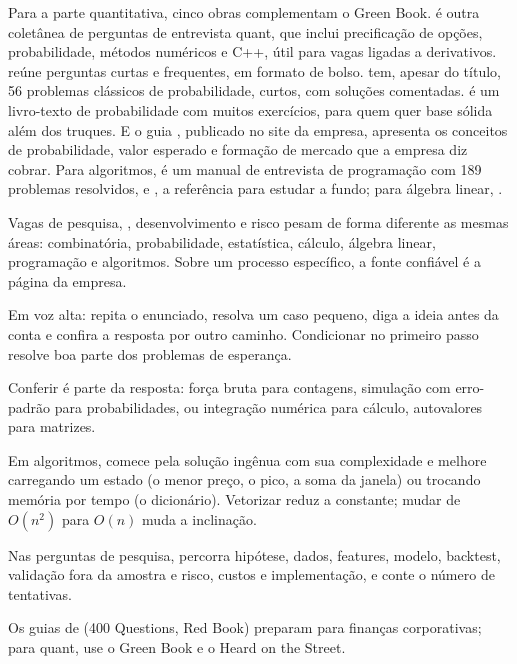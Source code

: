 Para a parte quantitativa, cinco obras complementam o Green Book. \citet{joshi2013} é outra coletânea de perguntas de entrevista quant, que inclui precificação de opções, probabilidade, métodos numéricos e C++, útil para vagas ligadas a derivativos. \citet{stefanica2019} reúne perguntas curtas e frequentes, em formato de bolso. \citet{mosteller1987} tem, apesar do título, 56 problemas clássicos de probabilidade, curtos, com soluções comentadas. \citet{blitzstein2019} é um livro-texto de probabilidade com muitos exercícios, para quem quer base sólida além dos truques. E o guia \citet{janestreetpm}, publicado no site da empresa, apresenta os conceitos de probabilidade, valor esperado e formação de mercado que a empresa diz cobrar. Para algoritmos, \citet{mcdowell2015} é um manual de entrevista de programação com 189 problemas resolvidos, e \citet{cormen2022}, a referência para estudar a fundo; para álgebra linear, \citet{strang2023}.

\begin{resumo}
  \item Vagas de pesquisa, , desenvolvimento e risco pesam de forma diferente as mesmas áreas: combinatória, probabilidade, estatística, cálculo, álgebra linear, programação e algoritmos. Sobre um processo específico, a fonte confiável é a página da empresa.
  \item Em voz alta: repita o enunciado, resolva um caso pequeno, diga a ideia antes da conta e confira a resposta por outro caminho. Condicionar no primeiro passo resolve boa parte dos problemas de esperança.
  \item Conferir é parte da resposta: força bruta para contagens, simulação com erro-padrão para probabilidades,  ou integração numérica para cálculo, autovalores para matrizes.
  \item Em algoritmos, comece pela solução ingênua com sua complexidade e melhore carregando um estado (o menor preço, o pico, a soma da janela) ou trocando memória por tempo (o dicionário). Vetorizar reduz a constante; mudar de $O(n^2)$ para $O(n)$ muda a inclinação.
  \item Nas perguntas de pesquisa, percorra hipótese, dados, features, modelo, backtest, validação fora da amostra e risco, custos e implementação, e conte o número de tentativas.
  \item Os guias de  (400 Questions, Red Book) preparam para finanças corporativas; para quant, use o Green Book e o Heard on the Street.
\end{resumo}


